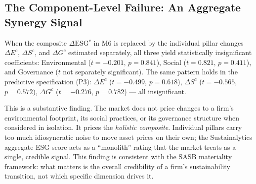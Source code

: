 \subsection*{The Component-Level Failure: An Aggregate Synergy Signal}

When the composite $\Delta\mathrm{ESG}^c$ in M6 is replaced by the individual pillar changes $\Delta E^c$, $\Delta S^c$, and $\Delta G^c$ estimated separately, all three yield statistically insignificant coefficients: Environmental ($t = -0.201$, $p = 0.841$), Social ($t = 0.821$, $p = 0.411$), and Governance ($t$ not separately significant). The same pattern holds in the predictive specification (P3): $\Delta E^c$ ($t = -0.499$, $p = 0.618$), $\Delta S^c$ ($t = -0.565$, $p = 0.572$), $\Delta G^c$ ($t = -0.276$, $p = 0.782$) --- all insignificant.

This is a substantive finding. The market does not price changes to a firm's environmental footprint, its social practices, or its governance structure when considered in isolation. It prices the \emph{holistic composite}. Individual pillars carry too much idiosyncratic noise to move asset prices on their own; the Sustainalytics aggregate ESG score acts as a ``monolith'' rating that the market treats as a single, credible signal. This finding is consistent with the SASB materiality framework: what matters is the overall credibility of a firm's sustainability transition, not which specific dimension drives it.


